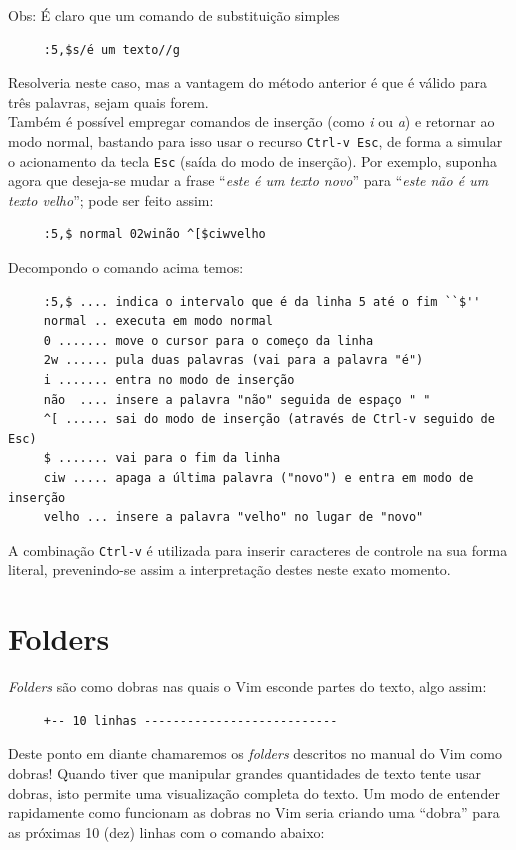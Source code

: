 \documentclass[10pt,a4paper,openany]{book}
\begin{document}
Obs: É claro que um comando de substituição simples

\begin{verbatim}
     :5,$s/é um texto//g
\end{verbatim}

Resolveria neste caso, mas a vantagem do método anterior é que
é válido para três palavras, sejam quais forem.\\

Também é possível empregar comandos de inserção (como {\em i} ou {\em a}) e
retornar ao modo normal, bastando para isso usar o recurso \verb|Ctrl-v Esc|,
de forma a simular o acionamento da tecla \verb|Esc| (saída do modo de
inserção). Por exemplo, suponha agora que deseja-se mudar a frase ``{\em este
é um texto novo}'' para ``{\em este não é um texto velho}''; pode ser feito
assim:

\begin{verbatim}
     :5,$ normal 02winão ^[$ciwvelho
\end{verbatim}

Decompondo o comando acima temos:

\begin{verbatim}
     :5,$ .... indica o intervalo que é da linha 5 até o fim ``$''
     normal .. executa em modo normal
     0 ....... move o cursor para o começo da linha
     2w ...... pula duas palavras (vai para a palavra "é")
     i ....... entra no modo de inserção
     não  .... insere a palavra "não" seguida de espaço " "
     ^[ ...... sai do modo de inserção (através de Ctrl-v seguido de Esc)
     $ ....... vai para o fim da linha
     ciw ..... apaga a última palavra ("novo") e entra em modo de inserção
     velho ... insere a palavra "velho" no lugar de "novo"
\end{verbatim}

A combinação \verb|Ctrl-v| é utilizada para inserir caracteres de controle na
sua forma literal, prevenindo-se assim a interpretação destes neste exato
momento.
\chapter{Folders}\label{cha:Folders}
{\em Folders} são como dobras nas quais o Vim esconde partes do texto,
algo assim:

\begin{verbatim}
     +-- 10 linhas ---------------------------
\end{verbatim}

Deste ponto em diante chamaremos os {\em folders} descritos no manual do
Vim como dobras!  Quando tiver que manipular grandes quantidades de
texto tente usar dobras, isto permite uma visualização completa do
texto.  Um modo de entender rapidamente como funcionam as dobras no
Vim seria criando uma ``dobra'' para as próximas 10 (dez) linhas com o
comando abaixo:
\end{document}

